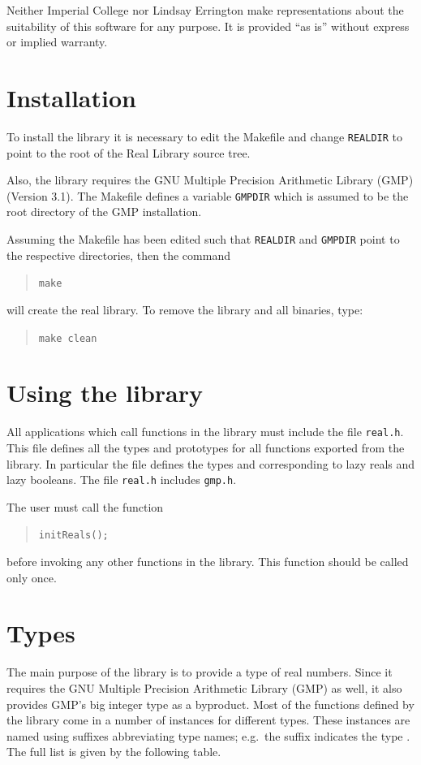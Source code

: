 \documentclass[a4paper,12pt]{article}
\begin{document}
Neither Imperial College nor Lindsay Errington make representations about
the suitability of this software for any purpose.  It is provided ``as is''
without express or implied warranty.

\section{Installation}

To install the library it is necessary to
edit the Makefile and change \texttt{REALDIR} to point to the
root of the Real Library source tree.

Also, the library requires the GNU Multiple Precision Arithmetic Library
(GMP) (Version 3.1). The Makefile defines a variable
\texttt{GMPDIR} which is assumed to be the root directory of the
GMP installation.

Assuming the Makefile has been edited such that \texttt{REALDIR}
and \texttt{GMPDIR} point to the respective directories,
then the command
\begin{quote}
\texttt{make}
\end{quote}
will create the real library. To remove the library
and all binaries, type:
\begin{quote}
\texttt{make clean}
\end{quote}

\section{Using the library}

All applications which call functions in the library must include
the file \texttt{real.h}. This file defines all the types
and prototypes for all functions exported from the library.
In particular
the file defines the types  and  corresponding
to lazy reals and lazy booleans. The file \texttt{real.h} includes
\texttt{gmp.h}.

The user must call the function
\begin{quote}
\texttt{initReals();}
\end{quote}
before invoking any other functions in the library.
This function should be called only once.

\section{Types}

The main purpose of the library is to provide
a type  of real numbers.
Since it requires
the GNU Multiple Precision Arithmetic Library (GMP) as well,
it also provides GMP's big integer type  as a byproduct.
Most of the functions defined by the library come in
a number of instances for different types.
These instances are named using suffixes
abbreviating type names; e.g.\ the suffix 
indicates the type .
The full list is given by the following table.
\end{document}
